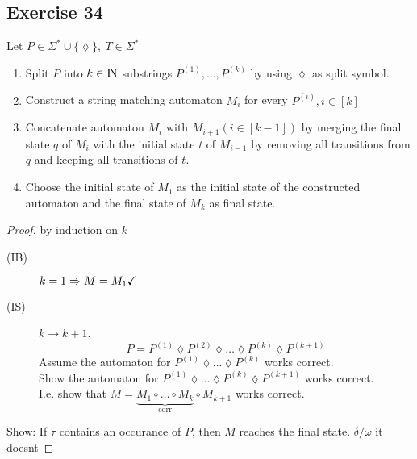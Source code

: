 \documentclass[12pt,oneside,a4paper,parskip=on,fleqn]{scrartcl}
\begin{document}
\subsection*{Exercise 34}
Let $P\in \Sigma^*\cup\{\lozenge\},\ T\in \Sigma^*$
\begin{enumerate}[(1)]
	\item Split $P$ into $k\in \N$ substrings $P^{(1)},\ldots,P^{(k)}$ by using $\lozenge$ as split symbol.
	\item Construct a string matching automaton $M_i$ for every $P^{(i)},i\in[k]$
	\item Concatenate automaton $M_i$ with $M_{i+1} (i\in [k-1])$ by merging the final state $q$ of $M_i$ with the initial state $t$ of $M_{i-1}$ by removing all transitions from $q$ and keeping all transitions of $t$.
	\item Choose the initial state of $M_1$ as the initial state of the constructed automaton and the final state of $M_k$ as final state.
\end{enumerate}
\begin{proof} by induction on $k$\\
	\begin{description}
		\item[(IB)] $k=1 \Rightarrow M=M_1\checkmark$
		\item[(IS)] $k\to k+1$.\\
			\[
				P = P^{(1)} \lozenge P^{(2)} \lozenge \dots \lozenge P^{(k)} \lozenge P^{(k+1)}
			\]
			Assume the automaton for $P^{(1)} \lozenge \dots \lozenge P^{(k)}$ works correct.\\
			Show the automaton for $P^{(1)} \lozenge \dots \lozenge P^{(k)} \lozenge P^{(k+1)}$ works correct.\\
			I.e. show that $M=\underbrace{M_1\circ \dots \circ M_k}_{\text{corr}}\circ M_{k+1}$ works correct.
	\end{description}
	Show: If $\tau$ contains an occurance of $P$, then $M$ reaches the final state. $\delta/\omega$ it doesnt
\end{proof}
\end{document}
